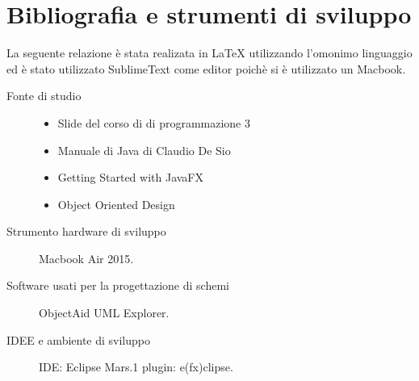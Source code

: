 \documentclass[a4paper, oneside]{book}
\begin{document}
\pagestyle{myheadings} 
\chapter*{Bibliografia e strumenti di sviluppo}
\pagestyle{myheadings} 

La seguente relazione è stata realizata in {\LaTeX} utilizzando l'omonimo linguaggio ed è stato utilizzato SublimeText come editor poichè si è utilizzato un Macbook.
\begin{description}
\item [Fonte di studio] 
        \begin{itemize}
            \item Slide del corso di di programmazione 3
            \item Manuale di Java di Claudio De Sio
            \item Getting Started with JavaFX
            \item Object Oriented Design
        \end{itemize} 
\item [Strumento hardware di sviluppo] Macbook Air 2015.
\item [Software usati per la progettazione di schemi]  ObjectAid UML Explorer.
\item [IDEE e ambiente di sviluppo] IDE: Eclipse Mars.1 plugin: e(fx)clipse.
\end{description} 
 
\end{document}

